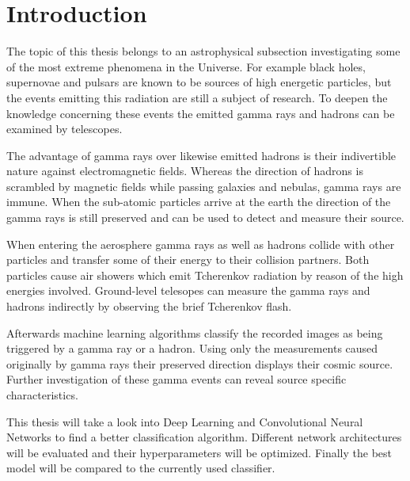 \chapter{Introduction}
The topic of this thesis belongs to an astrophysical subsection investigating some of the most extreme phenomena in the Universe.
For example black holes, supernovae and pulsars are known to be sources of high energetic particles,
but the events emitting this radiation are still a subject of research.
To deepen the knowledge concerning these events the emitted gamma rays and hadrons can be examined by telescopes.

The advantage of gamma rays over likewise emitted hadrons is their indivertible nature against electromagnetic fields.
Whereas the direction of hadrons is scrambled by magnetic fields while passing galaxies and nebulas, gamma rays are immune.
When the sub-atomic particles arrive at the earth the direction of the gamma rays is still preserved
and can be used to detect and measure their source.

When entering the aerosphere gamma rays as well as hadrons collide with other particles
and transfer some of their energy to their collision partners.
Both particles cause air showers which emit Tcherenkov radiation by reason of the high energies involved.
Ground-level telesopes can measure the gamma rays and hadrons indirectly by observing the brief Tcherenkov flash.

Afterwards machine learning algorithms classify the recorded images as being triggered by a gamma ray or a hadron.
Using only the measurements caused originally by gamma rays their preserved direction displays their cosmic source.
Further investigation of these gamma events can reveal source specific characteristics.

This thesis will take a look into Deep Learning and Convolutional Neural Networks to find a better classification algorithm.
Different network architectures will be evaluated and their hyperparameters will be optimized.
Finally the best model will be compared to the currently used classifier.
